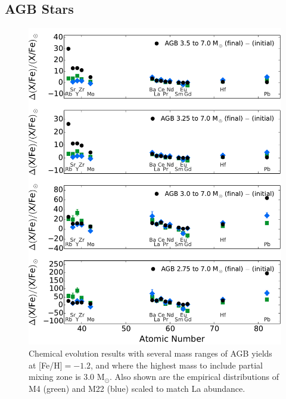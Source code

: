 \subsection{AGB Stars}
\begin{figure}
 \begin{center}\includegraphics[width=\textwidth]{f6.pdf}\end{center}
 \caption{Chemical evolution results with several mass ranges of AGB yields at [Fe/H]$=-1.2$, and where the highest mass to include partial mixing zone is 3.0 M$_\odot$. Also shown are the empirical distributions of M4 (green) and M22 (blue) scaled to match La abundance.}
 \label{fig:agbresults}
\end{figure}

